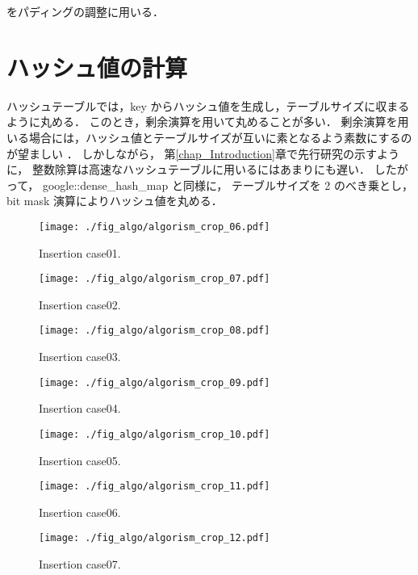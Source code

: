 をパディングの調整に用いる．

\section{ハッシュ値の計算}

ハッシュテーブルでは，key からハッシュ値を生成し，テーブルサイズに収まるように丸める．
このとき，剰余演算を用いて丸めることが多い．
剰余演算を用いる場合には，ハッシュ値とテーブルサイズが互いに素となるよう素数にするのが望ましい \citep{石畑1989}．
しかしながら，
第\ref{chap_Introduction}章で先行研究の示すように，
整数除算は高速なハッシュテーブルに用いるにはあまりにも遅い．
したがって，
google::dense\_hash\_map と同様に，
テーブルサイズを 2 のべき乗とし，
bit mask 演算によりハッシュ値を丸める．


\begin{figure}[h]
  \texttt{[image: ./fig\_algo/algorism\_crop\_06.pdf]}
  \caption{ Insertion case01. }
  \label{fig_IpCHashT_insert_hard_case01}
\end{figure}

\begin{figure}[h]
  \texttt{[image: ./fig\_algo/algorism\_crop\_07.pdf]}
  \caption{ Insertion case02. }
  \label{fig_IpCHashT_insert_hard_case02}
\end{figure}

\begin{figure}[h]
  \texttt{[image: ./fig\_algo/algorism\_crop\_08.pdf]}
  \caption{ Insertion case03. }
  \label{fig_IpCHashT_insert_hard_case03}
\end{figure}

\begin{figure}[h]
  \texttt{[image: ./fig\_algo/algorism\_crop\_09.pdf]}
  \caption{ Insertion case04. }
  \label{fig_IpCHashT_insert_hard_case04}
\end{figure}

\begin{figure}[h]
  \texttt{[image: ./fig\_algo/algorism\_crop\_10.pdf]}
  \caption{ Insertion case05. }
  \label{fig_IpCHashT_insert_hard_case05}
\end{figure}

\begin{figure}[h]
  \texttt{[image: ./fig\_algo/algorism\_crop\_11.pdf]}
  \caption{ Insertion case06. }
  \label{fig_IpCHashT_insert_hard_case06}
\end{figure}

\begin{figure}[h]
  \texttt{[image: ./fig\_algo/algorism\_crop\_12.pdf]}
  \caption{ Insertion case07. }
  \label{fig_IpCHashT_insert_hard_case07}
\end{figure}

